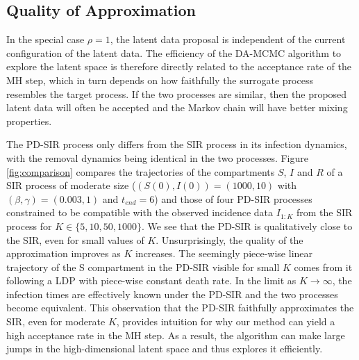 \documentclass[12pt]{article}
\begin{document}
	\subsection{Quality of Approximation}
	\label{sec:qua}
	
	In the special case $\rho=1$, the latent data proposal is independent of the current configuration of the latent data. The efficiency of the DA-MCMC algorithm to explore the latent space is therefore directly related to the acceptance rate of the MH step, which in turn depends on how faithfully the surrogate process resembles the target process. If the two processes are similar, then the proposed latent data will often be accepted and the Markov chain will have better mixing properties.
	
	The PD-SIR process only differs from the SIR process in its infection dynamics, with the removal dynamics being identical in the two processes. Figure \ref{fig:comparison} compares the trajectories of the compartments $S$, $I$ and $R$ of a SIR process of moderate size ($(S(0), I(0)) = (1000, 10)$ with $(\beta, \gamma) = (0.003, 1)$ and $t_{end} = 6$) and those of four PD-SIR processes constrained to be compatible with the observed incidence data $I_{1:K}$ from the SIR process for $K \in \{5, 10, 50, 1000\}$. We see that the PD-SIR is qualitatively close to the SIR, even for small values of $K$. Unsurprisingly, the quality of the approximation improves as $K$ increases. The seemingly piece-wise linear trajectory of the S compartment in the PD-SIR visible for small $K$ comes from it following a LDP with piece-wise constant death rate. In the limit as $K \rightarrow \infty$, the infection times are effectively known under the PD-SIR and the two processes become equivalent.
	This observation that the PD-SIR faithfully approximates  the SIR, even for moderate $K$, provides intuition for why our method can yield a high acceptance rate in the MH step. As a result, the algorithm can make large jumps in the high-dimensional latent space and thus explores it efficiently. %
	
\end{document}
